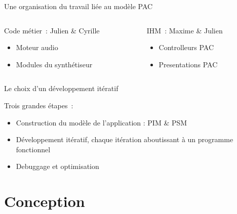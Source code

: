 \documentclass[frenchb]{beamer}
\begin{document}
\begin{frame}{Une organisation du travail liée au modèle PAC}
 \begin{columns}[t]
  \begin{column}{5cm}
  \begin{block}{Code métier~: Julien \& Cyrille}
             \begin{itemize}
                \item Moteur audio
                \item Modules du synthétiseur
            \end{itemize}    
  \end{block} 
  \end{column}
  
  \begin{column}{5cm}
  \begin{block}{IHM~: Maxime \& Julien}
            \begin{itemize}
                \item Controlleurs PAC
                \item Presentations PAC
            \end{itemize}
  \end{block}   
  \end{column}
 \end{columns}  
\end{frame}

\begin{frame}{Le choix d'un développement itératif}

\begin{block}{Trois grandes étapes~:}
\begin{itemize}
    \item Construction du modèle de l'application : PIM \& PSM
    \item Développement itératif, chaque itération aboutissant à un programme fonctionnel
    \item Debuggage et optimisation
\end{itemize}
\end{block}
\end{frame}

\section{Conception}
\end{document}
